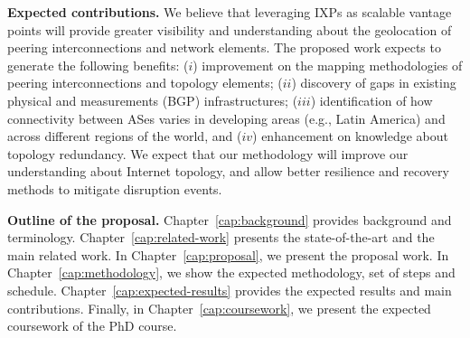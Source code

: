 	\textbf{Expected contributions.} We believe that leveraging IXPs as scalable vantage points will provide greater visibility and understanding about the geolocation of peering interconnections and network elements. The proposed work expects to generate the following benefits: ($i$) improvement on the mapping methodologies of peering interconnections and topology elements; ($ii$) discovery of gaps in existing physical and measurements (BGP) infrastructures; ($iii$) identification of how connectivity between ASes varies in developing areas (e.g., Latin America) and across different regions of the world, and ($iv$) enhancement on knowledge about topology redundancy. We expect that our methodology will improve our understanding about Internet topology, and allow better resilience and recovery methods to mitigate disruption events.


	\textbf{Outline of the proposal.} Chapter~\ref{cap:background} provides background and terminology. Chapter~\ref{cap:related-work} presents the state-of-the-art and the main related work. In Chapter~\ref{cap:proposal}, we present the proposal work. In Chapter~\ref{cap:methodology}, we show the expected methodology, set of steps and schedule. Chapter~\ref{cap:expected-results} provides the expected results and main contributions. Finally, in Chapter~\ref{cap:coursework}, we present the expected coursework of the PhD course.


